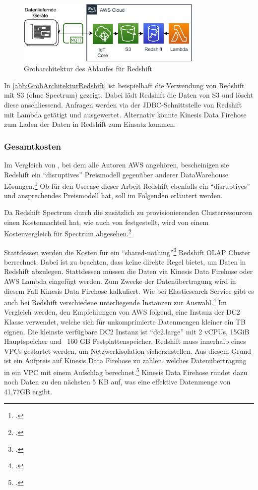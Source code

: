 \begin{figure}[H]
\centering
\includegraphics[width=0.8\textwidth]{graphics/Redshift-general.pdf}
\caption{Grobarchitektur des Ablaufes für Redshift}
\label{abb:GrobArchitekturRedshift}
\end{figure}

In \autoref{abb:GrobArchitekturRedshift} ist beispielhaft die Verwendung von Redshift mit \ac{S3} (ohne Spectrum) gezeigt. Dabei lädt Redshift die Daten von \ac{S3} und löscht diese anschliessend. Anfragen werden via der \ac{JDBC}-Schnittstelle von Redshift mit Lambda getätigt und ausgewertet. Alternativ könnte Kinesis Data Firehose zum Laden der Daten in Redshift zum Einsatz kommen.


\subsubsection{Gesamtkosten}
Im Vergleich von \citeauthor{Gupta.2015}, bei dem alle Autoren \ac{AWS} angehören, bescheinigen sie Redshift ein \enquote{disruptives} Preismodell gegenüber anderer DataWarehouse Lösungen.\footcite[Vgl.][]{Gupta.2015} Ob für den Usecase dieser Arbeit Redshift ebenfalls ein \enquote{disruptives} und ansprechendes Preismodell hat, soll im Folgenden erläutert werden.

Da Redshift Spectrum durch die zusätzlich zu provisionierenden Clusterresourcen einen Kostennachteil hat, wie auch von \citeauthor{Tan.2019} festgestellt, wird von einem Kostenvergleich für Spectrum abgesehen.\footcite[Vgl.][2178]{Tan.2019}

Stattdessen werden die Kosten für ein \enquote{shared-nothing}\footcite[Vgl.][2172]{Tan.2019} Redshift \ac{OLAP} Cluster berrechnet. Dabei ist zu beachten, dass \AWSIOT{} keine direkte Regel bietet, um Daten in Redshift abzulegen. Stattdessen müssen die Daten via Kinesis Data Firehose oder \ac{AWS} Lambda eingefügt werden. Zum Zwecke der Datenübertragung wird in diesem Fall Kinesis Data Firehose kalkuliert. Wie bei Elasticsearch Service gibt es auch bei Redshift verschiedene unterliegende Instanzen zur Auswahl.\footcite[Vgl. auch im Folgenden][]{AmazonWebServicesInc..o.J.z} Im Vergleich werden, den Empfehlungen von \ac{AWS} folgend, eine Instanz der \ac{DC2} Klasse verwendet, welche sich für unkomprimierte Datenmengen kleiner ein TB eignen. Die kleinste verfügbare \ac{DC2} Instanz ist \enquote{dc2.large} mit 2 vCPUs, 15GiB Hauptspeicher und ~160 GB Festplattenspeicher. Redshift muss innerhalb eines \acp{VPC} gestartet werden, um Netzwerkisolation sicherzustellen. Aus diesem Grund ist ein Aufpreis auf Kinesis Data Firehose zu zahlen, welches Datenübertragung in ein \ac{VPC} mit einem Aufschlag berechnet.\footcite[Vgl. auch im Folgenden][]{AmazonWebServicesInc..o.J.y} Kinesis Data Firehose rundet dazu noch Daten zu den nächsten 5 KB auf, was eine effektive Datenmenge von 41,77GB ergibt.

